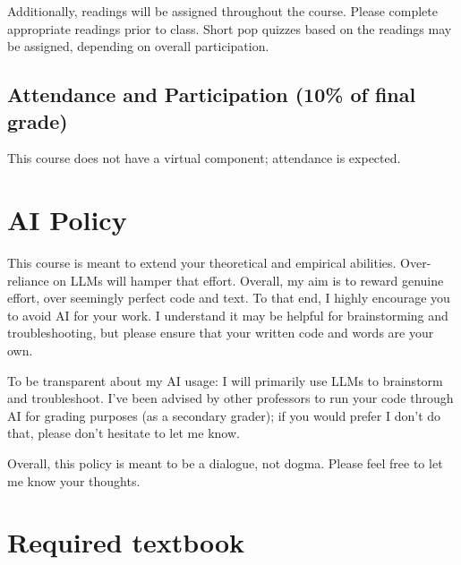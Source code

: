 \documentclass[11 pt]{article}
\begin{document}
Additionally, readings will be assigned throughout the course. 
Please complete appropriate readings prior to class.
Short pop quizzes based on the readings may be assigned, depending on overall participation. 

\subsection*{Attendance and Participation (10\% of final grade)}

This course does not have a virtual component; attendance is expected.

\section*{AI Policy}

This course is meant to extend your theoretical and empirical abilities. 
Over-reliance on LLMs will hamper that effort. 
Overall, my aim is to reward genuine effort, over seemingly perfect code and text. 
To that end, I highly encourage you to avoid AI for your work. 
I understand it may be helpful for brainstorming and troubleshooting, but please ensure that your written code and words are your own. 

To be transparent about my AI usage: I will primarily use LLMs to brainstorm and troubleshoot. 
I've been advised by other professors to run your code through AI for grading purposes (as a secondary grader); if you would prefer I don't do that, please don't hesitate to let me know. 

Overall, this policy is meant to be a dialogue, not dogma. 
Please feel free to let me know your thoughts. 



\section*{Required textbook}
\end{document}
